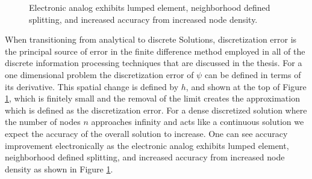 \begin{figure}[ht]
\centering{}
\caption{Electronic analog exhibits lumped element, neighborhood defined splitting, and increased accuracy from increased node density.}
\label{fig:1_03a_elec_accuracy}
\end{figure}
 
\par When transitioning from analytical to discrete Solutions, discretization error is the principal source of error in the finite difference method employed in all of the discrete information processing techniques that are discussed in the thesis. For a one dimensional problem the discretization error of $\psi$ can be defined in terms of its derivative. This spatial change is defined by $h$, and shown at the top of Figure \ref{fig:1_03a_elec_accuracy}, which is finitely small and the removal of the limit creates the approximation which is defined as the discretization error. For a dense discretized solution where the number of nodes $n$ approaches infinity and acts like a continuous solution we expect the accuracy of the overall solution to increase. One can see accuracy improvement electronically as the electronic analog exhibits lumped element, neighborhood defined splitting, and increased accuracy from increased node density as shown in Figure \ref{fig:1_03a_elec_accuracy}.

